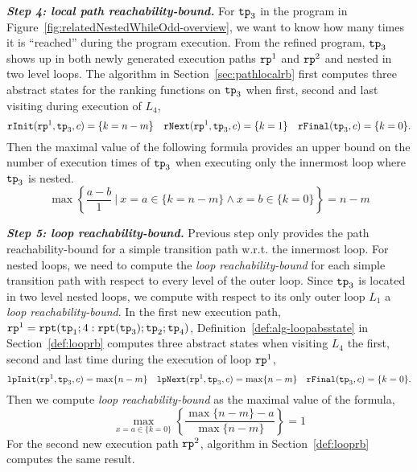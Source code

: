 \textbf{\emph{Step 4: local path reachability-bound.}}
For $\mathtt{tp}_3$ in the program in Figure~\ref{fig:relatedNestedWhileOdd-overview}, we want to know how many times it is ``reached'' during the program execution.
From the refined program, $\mathtt{tp}_3$ shows up in both newly generated execution paths $\mathtt{rp}^1$ and $\mathtt{rp}^2$  and nested in two level loops.
The algorithm in Section~\ref{sec:pathlocalrb} first
computes three abstract states for the ranking functions on $\mathtt{tp}_3$ when first, second and last visiting during execution of $L_4$,
\begin{equation*}
    \mathtt{rInit}(\mathtt{rp}^1, \mathtt{tp}_3, c) = \{k = n - m\} \quad
    \mathtt{rNext}(\mathtt{rp}^1, \mathtt{tp}_3, c) = \{k = 1\} \quad
    \mathtt{rFinal}(\mathtt{tp}_3, c) = \{ k = 0 \}.
\end{equation*}
Then  the maximal value of the following formula provides   
an upper bound on the number of execution times of $\mathtt{tp}_3$ when executing only the innermost loop where $\mathtt{tp}_3$ is nested. 
\[
    \max
    \left\{ 
        {\frac{a - b}{1}} 
        ~\vert~
        x = a \in \{k = n - m\}
        \land x = b \in \{ k = 0 \}
    \right\}  = n - m
\]

\textbf{\emph{Step 5: loop reachability-bound.}}
Previous step only provides the path reachability-bound for a simple transition path w.r.t. the innermost loop.
For nested loops, we need to compute the \emph{loop reachability-bound} for each simple transition path with respect to every level of the outer loop.
Since $\mathtt{tp}_3$ is located in two level nested loops, we compute 
with respect to its only outer loop $L_1$ a \emph{loop reachability-bound}.
In the first new execution path, $\mathtt{rp}^1 = \mathtt{rpt}(\mathtt{tp}_1; 4:\mathtt{rpt}(\mathtt{tp}_3); \mathtt{tp}_2; \mathtt{tp}_4)$,
Definition~\ref{def:alg-loopabsstate} in Section~\ref{def:looprb} computes three abstract states when visiting $L_4$ the first, second and last time during the execution of loop $\mathtt{rp}^1$,
\begin{equation*}
\mathtt{lpInit}(\mathtt{rp}^1, \mathtt{tp}_3, c) = \max\{ n - m\} \quad
\mathtt{lpNext}(\mathtt{rp}^1, \mathtt{tp}_3, c) = \max\{n - m\} \quad
\mathtt{rFinal}(\mathtt{tp}_3, c) = \{k = 0\}.
\end{equation*}
Then we compute \emph{loop reachability-bound} as the maximal value of the formula,
\[
    \max\limits_{x = a \in \{k = 0\}}
    \left\{ \frac{\max\{n - m\} - a }{\max\{n - m\}} \right\} = 1
  \]
For the second new execution path $\mathtt{rp}^2$, algorithm in Section~\ref{def:looprb} computes the same result.

